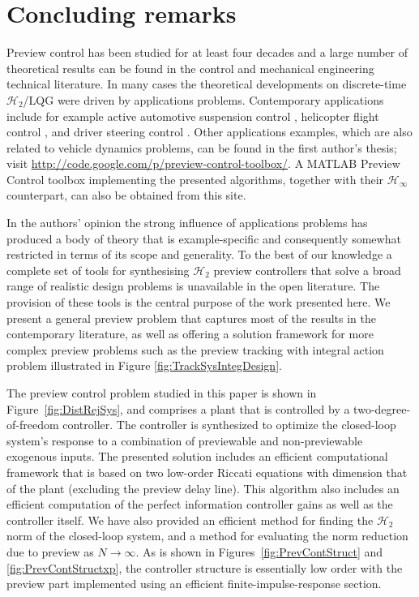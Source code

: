 \documentclass[a4paper,12pt]{article}
\theoremstyle{remark}
\newcommand{\hinf}{\mathcal H_\infty}
\newcommand{\htwo}{\mathcal H_2}
\begin{document}
\begin{description}
\end{description}
 
\section{Concluding remarks}
\label{sec:Conclusions}
Preview control has been studied for at least four decades and a large number of theoretical results can be found in the control and mechanical engineering technical literature. In many cases the theoretical developments on discrete-time $\htwo$/LQG were driven by applications problems. Contemporary applications include for example active automotive suspension control \cite{Roh_1999_Stoc_Opt_Prev,Marzbanrad_2004_SuspPrev}, helicopter flight control \cite{Paulino_2006_PreviewRotorcraftAffine}, 
and driver steering control \cite{Cole_2006_PredictiveAndPreviewSteeringControl}.
Other applications examples, which are also related to vehicle dynamics problems, can be found in the first author's thesis; visit \url{http://code.google.com/p/preview-control-toolbox/}. A MATLAB Preview Control toolbox implementing the presented algorithms, together with their $\hinf$ counterpart, can also be obtained from this site.

In the authors' opinion the strong influence of applications problems has produced a body of theory that is example-specific and consequently somewhat restricted in terms of its scope and generality. To the best of our knowledge a complete set of tools for synthesising $\htwo$ preview controllers that solve a broad range of realistic design problems is unavailable in the open literature. The provision of these tools is the central purpose of the work presented here. We present a general preview problem that captures most of the results in the contemporary literature, as well as offering a solution framework for more complex preview problems such as the preview tracking with integral action problem illustrated in Figure \ref{fig:TrackSysIntegDesign}.

The preview control problem studied in this paper is shown in Figure~\ref{fig:DistRejSys}, and  comprises a plant that is controlled by a two-degree-of-freedom controller. The controller is synthesized to optimize the closed-loop system's response to a combination of previewable and non-previewable exogenous inputs.  The presented solution includes an efficient computational framework that is based on two low-order Riccati equations with dimension that of the plant (excluding the preview delay line). This algorithm also includes an efficient computation of the perfect information controller gains as well as the controller itself. We have also provided an efficient method for finding the $\htwo$ norm of the closed-loop system, and a method for evaluating the norm reduction due to preview as $N \rightarrow \infty$. As is shown in Figures~\ref{fig:PrevContStruct} and \ref{fig:PrevContStructxp}, the controller structure is essentially low order with the preview part implemented using an efficient finite-impulse-response section. 
\end{document}
